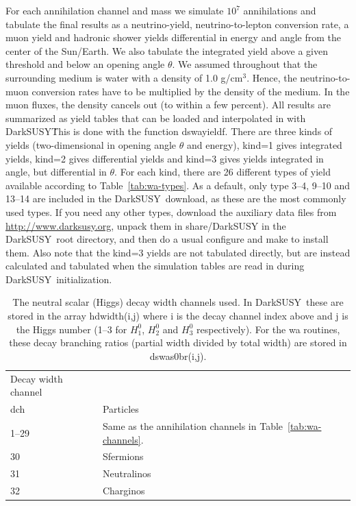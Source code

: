 \documentclass[a4paper,10pt,oneside]{book}
\newcommand{\code}[1]{\ft{#1}}
\newcommand{\ds}{{\sffamily DarkSUSY}}
\newcommand{\ft}[1]{\textsf{#1}}
\begin{document}
     For each annihilation channel and mass we simulate $10^{7}$ annihilations and tabulate the final results as a
     neutrino-yield, neutrino-to-lepton conversion rate, a muon yield and hadronic shower yields
     differential in energy and angle from the center of the Sun/Earth.
     We also tabulate the integrated yield above a given threshold and
     below an opening angle $\theta$. We assumed throughout that the
     surrounding medium is water with a density of 1.0 g/cm$^3$. Hence,
     the neutrino-to-muon conversion rates have to be multiplied by the
     density of the medium. In the muon fluxes, the density cancels out
     (to within a few percent). All results are summarized as yield tables that can be loaded and interpolated in with \ds\. This is done with the function \code{dswayieldf}. There are three kinds of yields (two-dimensional in opening angle $\theta$ and energy),
     \code{kind}=1 gives integrated yields, \code{kind}=2 gives differential yields and \code{kind}=3 gives yields integrated in angle, but differential in $\theta$. For each \code{kind}, there are 26 different \code{type}s of yield available according to Table~\ref{tab:wa-types}. As a default, only \code{type} 3--4, 9--10 and 13--14 are included in the \ds\ download, as these are the most commonly used types. If you need any other types, download the auxiliary data files from \url{http://www.darksusy.org}, unpack them in \code{share/DarkSUSY} in the \ds\ root directory, and then do a usual configure and make to install them.
Also note that the \code{kind}=3 yields are not tabulated directly, but are instead calculated and tabulated when the simulation tables are read in during \ds\ initialization.

\begin{table}
\begin{tabular}{ll}
Decay width channel &  \\
\code{dch} & Particles \\ \hline
1--29 & Same as the annihilation channels in Table~\ref{tab:wa-channels}. \\
30 & Sfermions \\
31 & Neutralinos \\
32 & Charginos \\ \hline
\end{tabular}
\caption{The neutral scalar (Higgs) decay width channels used. In \ds\, these are stored in the array \code{hdwidth(i,j)} where \code{i} is the decay channel index above and \code{j} is the Higgs number (1--3 for $H_1^0$, $H_2^0$ and $H_3^0$ respectively). For the \code{wa} routines, these decay branching ratios (partial width divided by total width) are stored in \code{dswas0br(i,j)}.
 \label{tab:hdecay0}}
\end{table}
\end{document}
